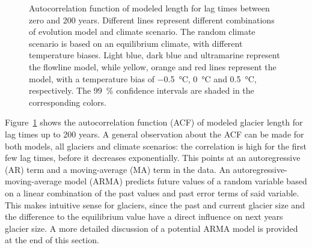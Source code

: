 \begin{figure}[htp]
        \caption{Autocorrelation function of modeled length for lag times between zero and 200 years. Different lines represent different combinations of evolution model and climate scenario.
        The random climate scenario is based on an equilibrium climate, with different temperature biases.
        Light blue, dark blue and ultramarine represent the flowline model, while yellow, orange and red lines represent the \vas{} model, with a temperature bias of \SI{-.5}{\celsius}, \SI{0}{\celsius} and \SI{+.5}{\celsius}, respectively.
        The \SI{99}{\percent} confidence intervals are shaded in the corresponding colors.}
        \label{fig:acf}
      \end{figure}

      Figure~\ref{fig:acf} shows the autocorrelation function (ACF) of modeled glacier length for lag times up to 200 years. A general observation about the ACF can be made for both models, all glaciers and climate scenarios: the correlation is high for the first few lag times, before it decreases exponentially. This points at an autoregressive (AR) term and a moving-average (MA) term in the data. An autoregressive-moving-average model (ARMA) predicts future values of a random variable based on a linear combination of the past values and past error terms of said variable. This makes intuitive sense for glaciers, since the past and current glacier size and the difference to the equilibrium value have a direct influence on next years glacier size. A more detailed discussion of a potential ARMA model is provided at the end of this section.

